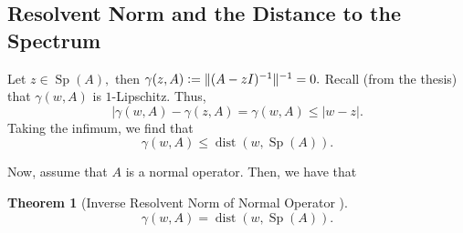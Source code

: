 \documentclass[12pt,a4paper]{article}
\newcommand{\defeq}{\vcentcolon=}
\newcommand{\Sp}[1]{\operatorname{Sp}\!\left(#1\right)}
\theoremstyle{boldthm}
\newtheorem{theorem}{Theorem}[section]
\theoremstyle{bolddefn}
\begin{document}
\subsection{Resolvent Norm and the Distance to the Spectrum}

Let $z \in \Sp{A},$ then $\gamma(z, A) \defeq \| (A-zI)^{-1} \|^{-1} = 0.$ Recall (from the thesis) that $\gamma(w, A)$ is $1$-Lipschitz. Thus, 
\begin{equation}
     | \gamma(w, A) - \gamma(z, A)  =  \gamma(w, A)  \le | w - z |.
\end{equation}
Taking the infimum, we find that
\begin{equation}
    \gamma(w, A) \le \operatorname{dist}(w, \Sp{A}).
\end{equation}


Now, assume that $A$ is a normal operator. Then, we have that
\begin{theorem}[Inverse Resolvent Norm of Normal Operator {\cite[Exercise 1.8]{Matt}}]
    \begin{equation}
        \gamma(w, A) = \operatorname{dist}(w, \Sp{A}).
    \end{equation}
\end{theorem}
\end{document}
